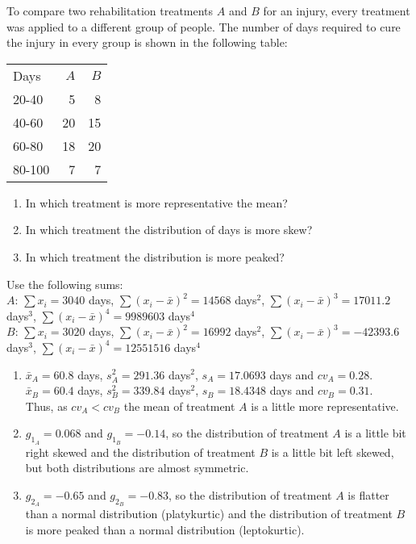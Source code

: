 {To compare two rehabilitation treatments $A$ and $B$ for an injury, every treatment was applied to a different
group of people. The number of days required to cure the injury in every group is shown in the following table:
\begin{center}
\begin{tabular}{lrr}
\toprule
Days & $A$ & $B$ \\
20-40 & 5 & 8 \\
40-60 & 20 & 15 \\
60-80 & 18 & 20 \\
80-100 & 7 & 7 \\
\bottomrule
\end{tabular}
\end{center}

\begin{enumerate}
\item In which treatment is more representative the mean?
\item In which treatment the distribution of days is more skew?
\item In which treatment the distribution is more peaked?
\end{enumerate}

Use the following sums:\\
$A$: $\sum x_i= 3040$ days, $\sum (x_i-\bar x)^2=14568$ days$^2$, $\sum (x_i-\bar x)^3=17011.2$ days$^3$, $\sum
(x_i-\bar x)^4=9989603$ days$^4$\\
$B$: $\sum x_i= 3020$ days, $\sum (x_i-\bar x)^2=16992$ days$^2$, $\sum (x_i-\bar x)^3=-42393.6$ days$^3$, $\sum
(x_i-\bar x)^4=12551516$ days$^4$
}
{\begin{enumerate}
\item $\bar x_A=60.8$ days, $s^2_A=291.36$ days$^2$, $s_A=17.0693$ days and $cv_A = 0.28$.\\
$\bar x_B=60.4$ days, $s^2_B=339.84$ days$^2$, $s_B=18.4348$ days and $cv_B = 0.31$.\\
Thus, as $cv_A<cv_B$ the mean of treatment $A$ is a little more representative.
\item $g_{1_A} = 0.068$ and $g_{1_B} = -0.14$, so the distribution of treatment $A$ is a little bit right skewed and the distribution of treatment $B$ is a little bit left skewed, but both distributions are almost symmetric.
\item $g_{2_A}=-0.65$ and $g_{2_B}=-0.83$, so the distribution of treatment $A$ is flatter than a normal distribution (platykurtic) and the distribution of treatment $B$ is more peaked than a normal distribution (leptokurtic).
\end{enumerate}
}
{}



